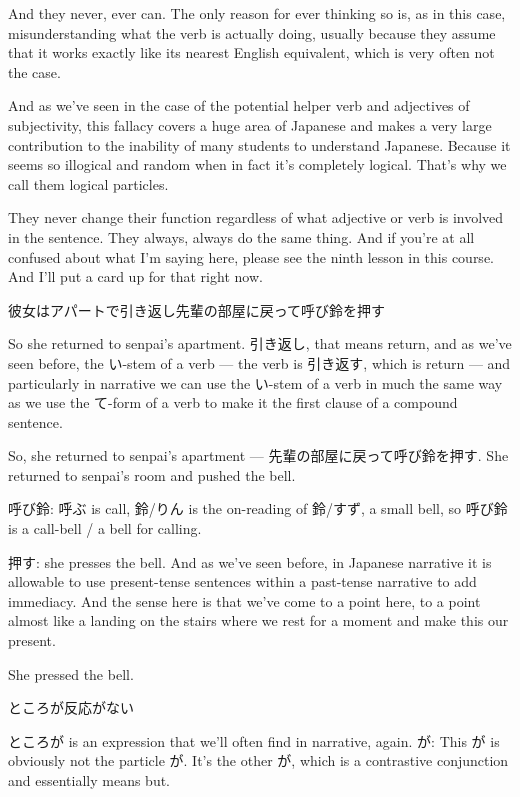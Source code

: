 And they never, ever can. The only reason for ever thinking so is, as in this case, misunderstanding what the verb is actually doing, usually because they assume that it works exactly like its nearest English equivalent, which is very often not the case.

And as we've seen in the case of the potential helper verb and adjectives of subjectivity, this fallacy covers a huge area of Japanese and makes a very large contribution to the inability of many students to understand Japanese. Because it seems so illogical and random when in fact it's completely logical. That's why we call them logical particles.

{}

They never change their function regardless of what adjective or verb is involved in the sentence. They always, always do the same thing. And if you're at all confused about what I'm saying here, please see the ninth lesson in this course. And I'll put a card up for that right now.

彼女はアパートで引き返し先輩の部屋に戻って呼び鈴を押す

{}

So she returned to senpai's apartment. 引き返し, that means return, and as we've seen before, the い-stem of a verb --- the verb is 引き返す, which is return --- and particularly in narrative we can use the い-stem of a verb in much the same way as we use the て-form of a verb to make it the first clause of a compound sentence.

So, she returned to senpai's apartment --- 先輩の部屋に戻って呼び鈴を押す. She returned to senpai's room and pushed the bell.

呼び鈴: 呼ぶ is call, 鈴/りん is the on-reading of 鈴/すず, a small bell, so 呼び鈴 is a call-bell / a bell for calling.

押す: she presses the bell. And as we've seen before, in Japanese narrative it is allowable to use present-tense sentences within a past-tense narrative to add immediacy. And the sense here is that we've come to a point here, to a point almost like a landing on the stairs where we rest for a moment and make this our present.

She pressed the bell.

ところが反応がない

{}

ところが is an expression that we'll often find in narrative, again. が: This が is obviously not the particle が. It's the other が, which is a contrastive conjunction and essentially means but.

